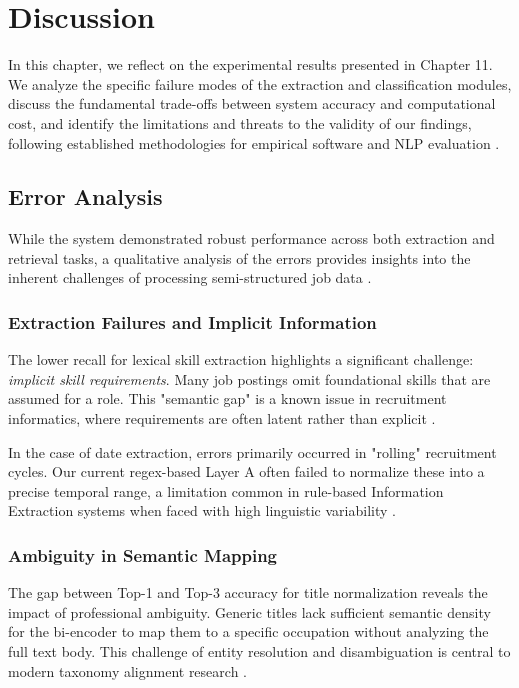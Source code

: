 \chapter{Discussion}
In this chapter, we reflect on the experimental results presented in Chapter 11. We analyze the specific failure modes of the extraction and classification modules, discuss the fundamental trade-offs between system accuracy and computational cost, and identify the limitations and threats to the validity of our findings, following established methodologies for empirical software and NLP evaluation \cite{buttcher2016information, manning2008introduction}.

\section{Error Analysis}
While the system demonstrated robust performance across both extraction and retrieval tasks, a qualitative analysis of the errors provides insights into the inherent challenges of processing semi-structured job data \cite{sarawagi2008information, tamburri2020data}.

\subsection{Extraction Failures and Implicit Information}
The lower recall for lexical skill extraction highlights a significant challenge: \textit{implicit skill requirements}. Many job postings omit foundational skills that are assumed for a role. This "semantic gap" is a known issue in recruitment informatics, where requirements are often latent rather than explicit \cite{giabelli2021skills, qin2018enhancing}.

In the case of date extraction, errors primarily occurred in "rolling" recruitment cycles. Our current regex-based Layer A often failed to normalize these into a precise temporal range, a limitation common in rule-based Information Extraction systems when faced with high linguistic variability \cite{grishman2015information}.

\subsection{Ambiguity in Semantic Mapping}
The gap between Top-1 and Top-3 accuracy for title normalization reveals the impact of professional ambiguity. Generic titles lack sufficient semantic density for the bi-encoder to map them to a specific occupation without analyzing the full text body. This challenge of entity resolution and disambiguation is central to modern taxonomy alignment research \cite{zhang2022survey, sayfullina2018learning}.

